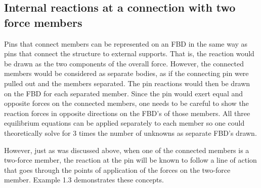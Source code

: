 \documentclass[
  letterpaper,
  DIV=11,
  numbers=noendperiod]{scrreprt}
\begin{document}
\subsection{Internal reactions at a connection with two force
members}\label{internal-reactions-at-a-connection-with-two-force-members}

Pins that connect members can be represented on an FBD in the same way
as pins that connect the structure to external supports. That is, the
reaction would be drawn as the two components of the overall force.
However, the connected members would be considered as separate bodies,
as if the connecting pin were pulled out and the members separated. The
pin reactions would then be drawn on the FBD for each separated member.
Since the pin would exert equal and opposite forces on the connected
members, one needs to be careful to show the reaction forces in opposite
directions on the FBD's of those members. All three equilibrium
equations can be applied separately to each member so one could
theoretically solve for 3 times the number of unknowns as separate FBD's
drawn.

However, just as was discussed above, when one of the connected members
is a two-force member, the reaction at the pin will be known to follow a
line of action that goes through the points of application of the forces
on the two-force member. Example 1.3 demonstrates these concepts.
\end{document}
